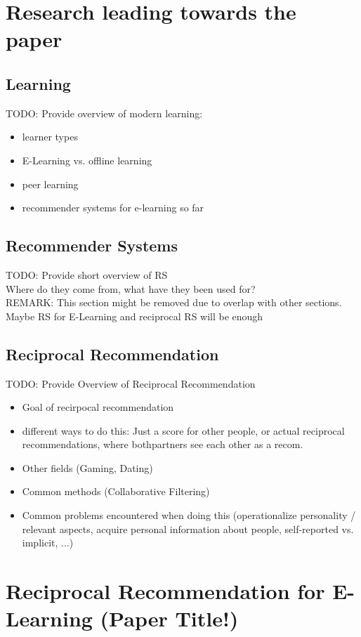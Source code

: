 \documentclass[nochapterpage,bigchapter,linedtoc,longdoc,colorback,accentcolor=tud3b]{tudreport}
\begin{document}
\chapter{Research leading towards the paper}
\section{Learning}
TODO: Provide overview of modern learning:\\
\begin{itemize}
	\item learner types
	\item E-Learning vs. offline learning
	\item peer learning
	\item recommender systems for e-learning so far
\end{itemize}

\section{Recommender Systems}
TODO: Provide short overview of RS\\
Where do they come from, what have they been used for?\\
REMARK: This section might be removed due to overlap with other sections. Maybe RS for E-Learning and reciprocal RS will be enough\\

\section{Reciprocal Recommendation}
TODO: Provide Overview of Reciprocal Recommendation\\
\begin{itemize}
	\item Goal of recirpocal recommendation
	\item different ways to do this: Just a score for other people, or actual reciprocal recommendations, where bothpartners see each other as a recom.
	\item Other fields (Gaming, Dating)
	\item Common methods (Collaborative Filtering)
	\item Common problems encountered when doing this (operationalize personality / relevant aspects, acquire personal information about people, self-reported vs. implicit, ...)
\end{itemize}

\chapter{Reciprocal Recommendation for E-Learning (Paper Title!)}
\end{document}
